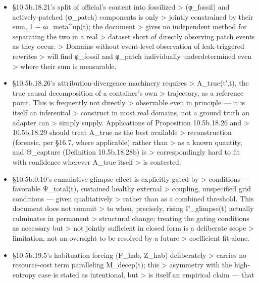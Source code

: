 \documentclass[
]{article}
\begin{document}
\begin{itemize}
  so the \textgreater{} quantity is computable, not because it is known
  to be accurate.
\item
  §10.5b.18.21's split of official's content into fossilized
  \textgreater{} (φ\_fossil) and actively-patched (φ\_patch) components
  is only \textgreater{} jointly constrained by their sum, 1 −
  ω\_meta\^{}up(t); the document \textgreater{} gives no independent
  method for separating the two in a real \textgreater{} dataset short
  of directly observing patch events as they occur. \textgreater{}
  Domains without event-level observation of leak-triggered rewrites
  \textgreater{} will find φ\_fossil and φ\_patch individually
  underdetermined even \textgreater{} where their sum is measurable.
\item
  §10.5b.18.26's attribution-divergence machinery requires
  \textgreater{} A\_true(t′,t), the true causal decomposition of a
  container's own \textgreater{} trajectory, as a reference point. This
  is frequently not directly \textgreater{} observable even in principle
  --- it is itself an inferential \textgreater{} construct in most real
  domains, not a ground truth an adapter can \textgreater{} simply
  supply. Applications of Proposition 10.5b.18.26 and \textgreater{}
  10.5b.18.29 should treat A\_true as the best available \textgreater{}
  reconstruction (forensic, per §16.7, where applicable) rather than
  \textgreater{} as a known quantity, and Θ\_capture (Definition
  10.5b.18.28b) is \textgreater{} correspondingly hard to fit with
  confidence wherever A\_true itself \textgreater{} is contested.
\item
  §10.5b.0.10's cumulative glimpse effect is explicitly gated by
  \textgreater{} conditions --- favorable Ψ\_total(t), sustained healthy
  external \textgreater{} coupling, unspecified grid conditions ---
  given qualitatively \textgreater{} rather than as a combined
  threshold. This document does not commit \textgreater{} to when,
  precisely, rising Γ\_glimpse(t) actually culminates in permanent
  \textgreater{} structural change; treating the gating conditions as
  necessary but \textgreater{} not jointly sufficient in closed form is
  a deliberate scope \textgreater{} limitation, not an oversight to be
  resolved by a future \textgreater{} coefficient fit alone.
\item
  §10.5b.19.5's habituation forcing (F\_hab, Z\_hab) deliberately
  \textgreater{} carries no resource-cost term paralleling M\_decep(t);
  this \textgreater{} asymmetry with the high-entropy case is stated as
  intentional, but \textgreater{} is itself an empirical claim --- that

\end{itemize}
\end{document}
